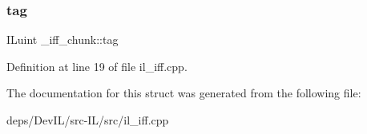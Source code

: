 \subsubsection{\texorpdfstring{tag}{tag}}
{\footnotesize\ttfamily I\+Luint \+\_\+iff\+\_\+chunk\+::tag}



Definition at line 19 of file il\+\_\+iff.\+cpp.



The documentation for this struct was generated from the following file\+:\begin{DoxyCompactItemize}
\item 
deps/\+Dev\+I\+L/src-\/\+I\+L/src/il\+\_\+iff.\+cpp\end{DoxyCompactItemize}
